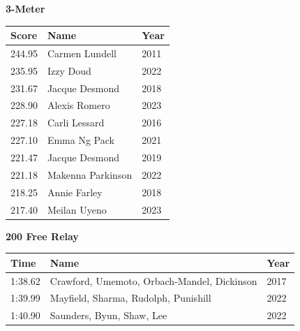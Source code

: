 \vspace{1.2em}
\noindent\begin{minipage}[t]{0.98\textwidth}
\centering
\textbf{\textcolor{teamprimary}{3-Meter}}\par
\vspace{0.5em}
\centering
\small
\renewcommand{\arraystretch}{1.0}
\setlength{\tabcolsep}{4pt}
\begin{tabular}{@{}p{1.8cm}p{3.0cm}p{1.0cm}@{}}
\toprule
\textbf{Score} & \textbf{Name} & \textbf{Year} \\
\midrule
244.95 & Carmen Lundell & 2011 \\
235.95 & Izzy Doud & 2022 \\
231.67 & Jacque Desmond & 2018 \\
228.90 & Alexis Romero & 2023 \\
227.18 & Carli Lessard & 2016 \\
227.10 & Emma Ng Pack & 2021 \\
221.47 & Jacque Desmond & 2019 \\
221.18 & Makenna Parkinson & 2022 \\
218.25 & Annie Farley & 2018 \\
217.40 & Meilan Uyeno & 2023 \\
\bottomrule
\end{tabular}
\end{minipage}
\vspace{1.2em}
\noindent\begin{minipage}[t]{0.98\textwidth}
\centering
\textbf{\textcolor{teamprimary}{200 Free Relay}}\par
\vspace{0.5em}
\centering
\small
\renewcommand{\arraystretch}{1.0}
\setlength{\tabcolsep}{4pt}
\begin{tabular}{@{}p{4.5cm}p{8.5cm}p{2.5cm}@{}}
\toprule
\textbf{Time} & \textbf{Name} & \textbf{Year} \\
\midrule
1:38.62 & Crawford, Umemoto, Orbach-Mandel, Dickinson & 2017 \\
1:39.99 & Mayfield, Sharma, Rudolph, Punishill & 2022 \\
1:40.90 & Saunders, Byun, Shaw, Lee & 2022 \\
\bottomrule
\end{tabular}
\end{minipage}
\vspace{1.2em}

